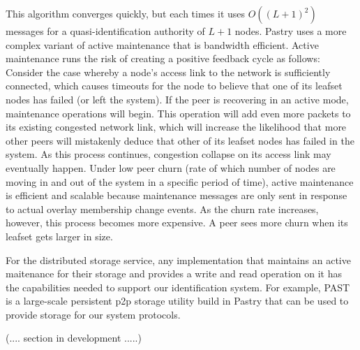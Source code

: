  This algorithm converges quickly, but each times it uses $O((L+1)^2)$ messages
for a quasi-identification authority of $L+1$ nodes.
Pastry uses a more complex variant of active maintenance that is
bandwidth efficient.
Active maintenance runs the risk of creating a positive feedback cycle as
follows: Consider the case whereby a node's access link to the network is
sufficiently connected, which causes timeouts for the node to believe that one
of its leafset nodes has failed (or left the system). If the peer is recovering
in an active mode, maintenance operations will begin. This operation will add
even more packets to its existing congested network link, which will increase
the likelihood that more other peers will mistakenly deduce that other of its leafset
nodes has failed in the system. As this process continues, congestion collapse
on its access link may eventually happen.
Under low peer churn (rate of which number of nodes are moving in and out of the
system in a specific period of time), active maintenance is efficient and scalable because
maintenance messages are only sent in response to actual overlay membership
change events. As the churn rate increases, however, this process becomes more
expensive. A peer sees more churn when its leafset gets larger in size.

For the distributed storage service, any implementation that maintains an
active maitenance for their storage and provides a write and read operation on
it has the capabilities needed to support our identification system. For
example, PAST~\cite{druschel2001past} is a large-scale persistent p2p storage
utility build in Pastry that can be used to provide storage for our system
protocols.

(.... section in development .....)


%

